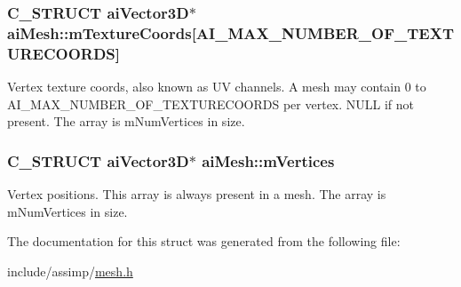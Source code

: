 \hypertarget{structaiMesh_a4a50b11d00ef50f419c75cab0f6bddd6}{
\subsubsection[{m\-Texture\-Coords}]{\setlength{\rightskip}{0pt plus 5cm}\-C\-\_\-\-S\-T\-R\-U\-C\-T {\bf ai\-Vector3\-D}$\ast$ {\bf ai\-Mesh\-::m\-Texture\-Coords}\mbox{[}{\bf \-A\-I\-\_\-\-M\-A\-X\-\_\-\-N\-U\-M\-B\-E\-R\-\_\-\-O\-F\-\_\-\-T\-E\-X\-T\-U\-R\-E\-C\-O\-O\-R\-D\-S}\mbox{]}}}\label{structaiMesh_a4a50b11d00ef50f419c75cab0f6bddd6}
\-Vertex texture coords, also known as \-U\-V channels. \-A mesh may contain 0 to \-A\-I\-\_\-\-M\-A\-X\-\_\-\-N\-U\-M\-B\-E\-R\-\_\-\-O\-F\-\_\-\-T\-E\-X\-T\-U\-R\-E\-C\-O\-O\-R\-D\-S per vertex. \-N\-U\-L\-L if not present. \-The array is m\-Num\-Vertices in size. \hypertarget{structaiMesh_afd4588abb3e1c72821ae0234a3850662}{
\subsubsection[{m\-Vertices}]{\setlength{\rightskip}{0pt plus 5cm}\-C\-\_\-\-S\-T\-R\-U\-C\-T {\bf ai\-Vector3\-D}$\ast$ {\bf ai\-Mesh\-::m\-Vertices}}}\label{structaiMesh_afd4588abb3e1c72821ae0234a3850662}
\-Vertex positions. \-This array is always present in a mesh. \-The array is m\-Num\-Vertices in size. 

\-The documentation for this struct was generated from the following file\-:\begin{DoxyCompactItemize}
\item 
include/assimp/\hyperlink{mesh_8h}{mesh.\-h}\end{DoxyCompactItemize}
